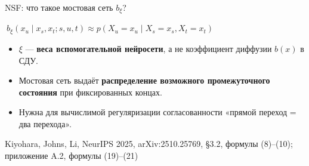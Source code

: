 \documentclass[10pt,aspectratio=169]{beamer}
\newcommand{\nsfsrc}[1]{\vfill{\tiny\color{graytext}Kiyohara, Johns, Li, NeurIPS 2025, arXiv:2510.25769, #1}}
\begin{document}
\begin{frame}{NSF: что такое мостовая сеть $b_\xi$?}
\vspace{0.13cm}
\begin{center}
\end{center}
\vspace{0.13cm}
\begin{center}
$\displaystyle \boxed{\ b_\xi(x_u\mid x_s,x_t;s,u,t)\approx
 p(X_u=x_u\mid X_s=x_s,X_t=x_t)\ }$
\end{center}
\vspace{0.15cm}
\begin{itemize}\setlength\itemsep{0.13cm}
\item $\xi$ --- \textbf{веса вспомогательной нейросети}, а не коэффициент диффузии $b(x)$ в СДУ.
\item Мостовая сеть выдаёт \textbf{распределение возможного промежуточного состояния} при фиксированных концах.
\item Нужна для вычислимой регуляризации согласованности «прямой переход = два перехода».
\end{itemize}
\nsfsrc{\S 3.2, формулы (8)--(10); приложение A.2, формулы (19)--(21)}
\end{frame}
\end{document}
